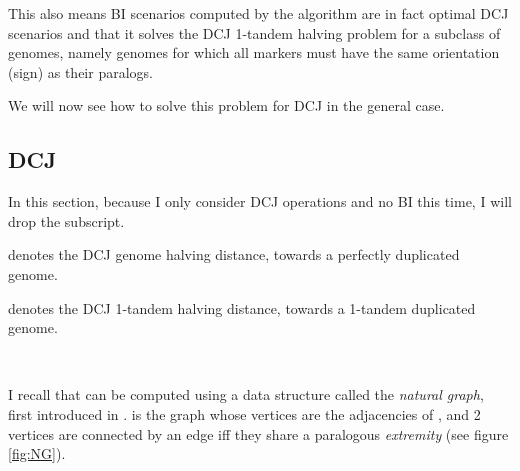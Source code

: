 \documentclass[11pt,final,twoside,nofrench]{thlifl}
\begin{document}
{This also means BI scenarios computed by the algorithm are in fact optimal DCJ scenarios and that it solves the DCJ 1-tandem halving problem for a subclass of genomes, namely genomes for which all markers must have the same orientation (sign) as their paralogs.

We will now see how to solve this problem for DCJ in the general case.

\subsection{DCJ}

\def\EP{{{\textsc{EP}}}}
\def\EC{{{\textsc{EC}}}}
\def\OC{{{\textsc{OC}}}}
\def\OP{{{\textsc{OP}}}}

In this section, because I only consider DCJ operations and no BI this time, I will drop the subscript.

 denotes the DCJ genome halving distance, towards a perfectly duplicated genome.

 denotes the DCJ 1-tandem halving distance, towards a 1-tandem duplicated genome.

~~

I recall that  can be computed using a data structure called the
\emph{natural graph}, first introduced in \cite{Mabrouk03}.  
is the graph whose vertices are the adjacencies of , and 2 vertices
are connected by an edge iff they share a paralogous \emph{extremity} (see figure
\ref{fig:NG}).

\begin{figure}
\end{figure}}
\end{document}

